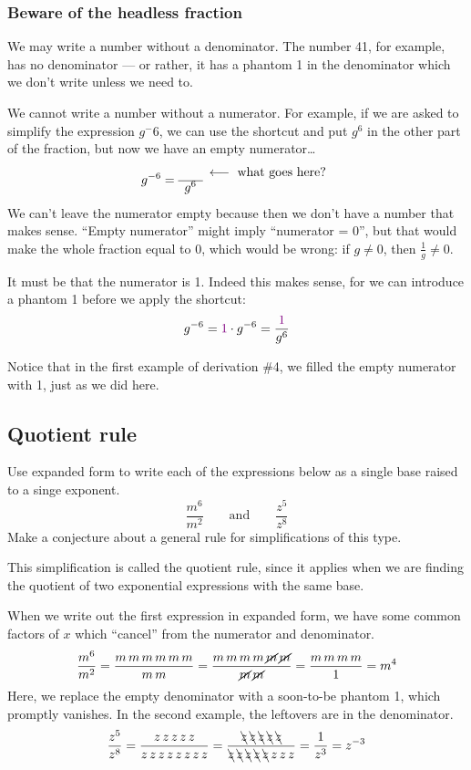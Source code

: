 \subsubsection{Beware of the headless fraction}

We may write a number without a denominator. The number 41, for example, has no denominator --- or rather, it has a phantom 1 in the denominator which we don't write unless we need to.

We cannot write a number without a numerator. For example, if we are asked to simplify the expression $g^-6$, we can use the shortcut and put $g^6$ in the other part of the fraction, but now we have an empty numerator\ldots \[g^{-6} = 
\begin{array}{cc}~~&\longleftarrow\text{ what goes here?}
\\\cline{1-1}
g^6 & ~~\end{array}\]
We can't leave the numerator empty because then we don't have a number that makes sense. ``Empty numerator'' might imply ``numerator = 0'', but that would make the whole fraction equal to 0, which would be wrong: if $g\neq0$, then $\frac{1}{g} \neq 0$.

It must be that the numerator is 1. Indeed this makes sense, for we can introduce a phantom 1 before we apply the shortcut:
\[g^{-6} = {\color{violet}1} \cdot g^{-6} = \frac{{\color{violet}1}}{g^6}\]

Notice that in the first example of derivation \#4, we filled the empty numerator with 1, just as we did here.


\subsection{Quotient rule}

\begin{boxedexplore}
Use expanded form to write each of the expressions below as a single base raised to a singe exponent.
\[\frac{m^6}{m^2} \qquad\text{and}\qquad \frac{z^5}{z^8}\]
Make a conjecture about a general rule for simplifications of this type.
\end{boxedexplore}

This simplification is called the quotient rule, since it applies when we are finding the quotient of two exponential expressions with the same base.

When we write out the first expression in expanded form, we have some common factors of $x$ which ``cancel'' from the numerator and denominator.
\[\frac{m^6}{m^2} = \frac{m\,m\,m\,m\,m\,m}{m\,m} = \frac{m\,m\,m\,m\,\cancel{m}\,\cancel{m}}{\cancel{m}\,\cancel{m}} = \frac{m\,m\,m\,m}{1} = m^4\]
Here, we replace the empty denominator with a soon-to-be phantom 1, which promptly vanishes. In the second example, the leftovers are in the denominator.
\[\frac{z^5}{z^8} = \frac{z\,z\,z\,z\,z}{z\,z\,z\,z\,z\,z\,z\,z} = \frac{\bcancel{z}\,\bcancel{z}\,\bcancel{z}\,\bcancel{z}\,\bcancel{z}}{\bcancel{z}\,\bcancel{z}\,\bcancel{z}\,\bcancel{z}\,\bcancel{z}\,z\,z\,z} = \frac{1}{z^3} = z^{-3}\]

